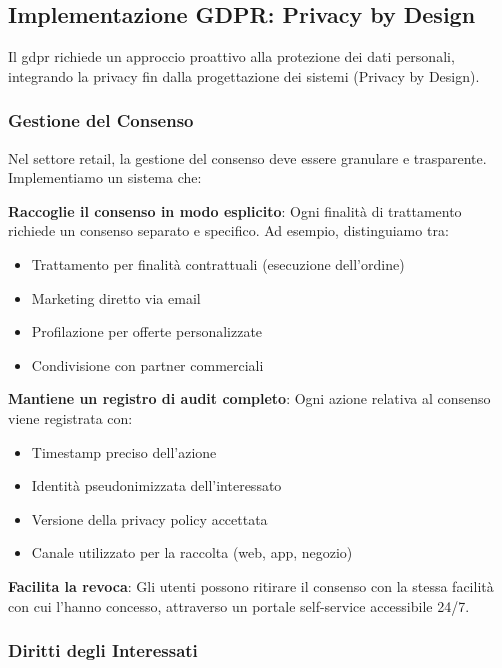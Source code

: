 \subsection{Implementazione GDPR: Privacy by Design}
\label{subsec:4.4.2_gdpr}

Il \gls{gdpr} richiede un approccio proattivo alla protezione dei dati personali, integrando la privacy fin dalla progettazione dei sistemi (Privacy by Design).

\subsubsection{Gestione del Consenso}

Nel settore retail, la gestione del consenso deve essere granulare e trasparente. Implementiamo un sistema che:

\textbf{Raccoglie il consenso in modo esplicito}: Ogni finalità di trattamento richiede un consenso separato e specifico. Ad esempio, distinguiamo tra:
\begin{itemize}
    \item Trattamento per finalità contrattuali (esecuzione dell'ordine)
    \item Marketing diretto via email
    \item Profilazione per offerte personalizzate
    \item Condivisione con partner commerciali
\end{itemize}

\textbf{Mantiene un registro di audit completo}: Ogni azione relativa al consenso viene registrata con:
\begin{itemize}
    \item Timestamp preciso dell'azione
    \item Identità pseudonimizzata dell'interessato
    \item Versione della privacy policy accettata
    \item Canale utilizzato per la raccolta (web, app, negozio)
\end{itemize}

\textbf{Facilita la revoca}: Gli utenti possono ritirare il consenso con la stessa facilità con cui l'hanno concesso, attraverso un portale self-service accessibile 24/7.

\subsubsection{Diritti degli Interessati}

